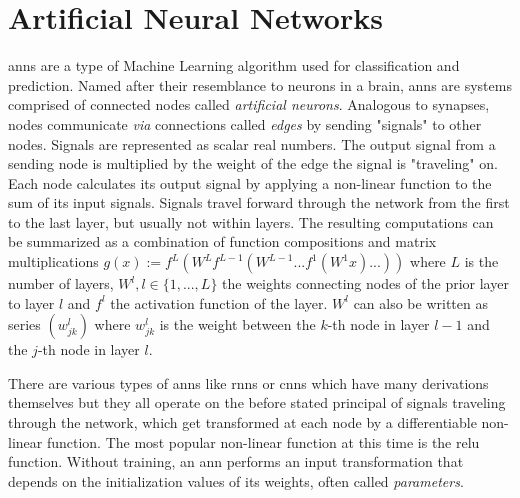 \section{Artificial Neural Networks} \label{sec:background:ann}

\glspl{ann} are a type of Machine Learning algorithm used for classification and prediction. Named after their resemblance to neurons in a brain, \glspl{ann} are systems comprised of connected nodes called \textit{artificial neurons}. Analogous to synapses, nodes communicate \textit{via} connections called \textit{edges} by sending "signals" to other nodes. Signals are represented as scalar real numbers. The output signal from a sending node is multiplied by the weight of the edge the signal is "traveling" on. Each node calculates its output signal by applying a non-linear function to the sum of its input signals. Signals travel forward through the network from the first to the last layer, but usually not within layers. The resulting computations can be summarized as a combination of function compositions and matrix multiplications $g(x) := f^L(W^Lf^{L-1}(W^{L-1}...f^1(W^1x)...))$ where $L$ is the number of layers, $W^l, l \in \{1,...,L\}$ the weights connecting nodes of the prior layer to layer $l$ and $f^l$ the activation function of the layer. $W^l$ can also be written as series $(w^l_{jk})$ where $w^l_{jk}$ is the weight between the $k$-th node in layer $l-1$ and the $j$-th node in layer $l$. \par There are various types of \glspl{ann} like \glspl{rnn} or \glspl{cnn} which have many derivations themselves but they all operate on the before stated principal of signals traveling through the network, which get transformed at each node by a differentiable non-linear function. The most popular non-linear function at this time is the \gls{relu} function. Without training, an \gls{ann} performs an input transformation that depends on the initialization values of its weights, often called \textit{parameters}. \par


